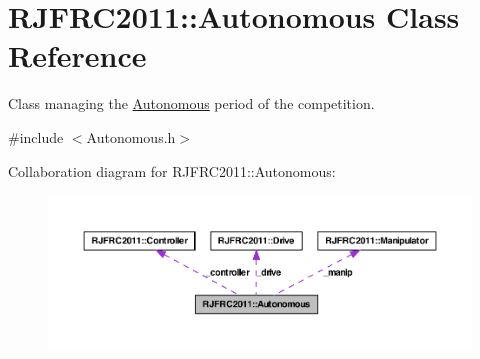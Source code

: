 \hypertarget{class_r_j_f_r_c2011_1_1_autonomous}{
\section{RJFRC2011::Autonomous Class Reference}
\label{class_r_j_f_r_c2011_1_1_autonomous}
}


Class managing the \hyperlink{class_r_j_f_r_c2011_1_1_autonomous}{Autonomous} period of the competition.  




{\ttfamily \#include $<$Autonomous.h$>$}



Collaboration diagram for RJFRC2011::Autonomous:
\nopagebreak
\begin{figure}[H]
\begin{center}
\leavevmode
\includegraphics[width=400pt]{class_r_j_f_r_c2011_1_1_autonomous__coll__graph}
\end{center}
\end{figure}
